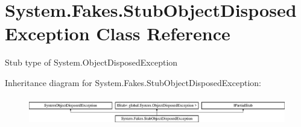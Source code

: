 \hypertarget{class_system_1_1_fakes_1_1_stub_object_disposed_exception}{\section{System.\-Fakes.\-Stub\-Object\-Disposed\-Exception Class Reference}
\label{class_system_1_1_fakes_1_1_stub_object_disposed_exception}
}


Stub type of System.\-Object\-Disposed\-Exception 


Inheritance diagram for System.\-Fakes.\-Stub\-Object\-Disposed\-Exception\-:\begin{figure}[H]
\begin{center}
\leavevmode
\includegraphics[height=1.252796cm]{class_system_1_1_fakes_1_1_stub_object_disposed_exception}
\end{center}
\end{figure}

